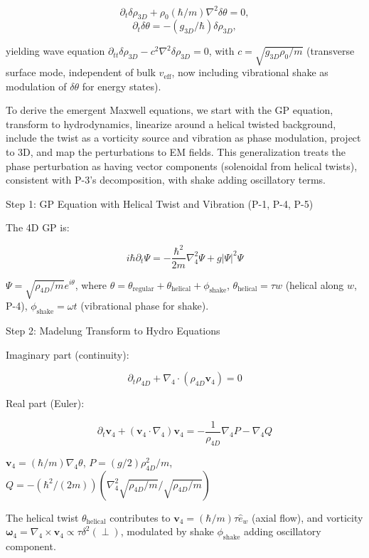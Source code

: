 \begin{equation}
\partial_t \delta \rho_{3D} + \rho_0 (\hbar / m) \nabla^2 \delta \theta = 0,
\end{equation}
\begin{equation}
\partial_t \delta \theta = - (g_{3D} / \hbar) \delta \rho_{3D},
\end{equation}

yielding wave equation $\partial_{tt} \delta \rho_{3D} - c^2 \nabla^2 \delta \rho_{3D} = 0$, with $c = \sqrt{g_{3D} \rho_0 / m}$ (transverse surface mode, independent of bulk $v_{\text{eff}}$, now including vibrational shake as modulation of $\delta \theta$ for energy states).

To derive the emergent Maxwell equations, we start with the GP equation, transform to hydrodynamics, linearize around a helical twisted background, include the twist as a vorticity source and vibration as phase modulation, project to 3D, and map the perturbations to EM fields. This generalization treats the phase perturbation as having vector components (solenoidal from helical twists), consistent with P-3's decomposition, with shake adding oscillatory terms.

Step 1: GP Equation with Helical Twist and Vibration (P-1, P-4, P-5)

The 4D GP is:

\[ i \hbar \partial_t \Psi = - \frac{\hbar^2}{2m} \nabla_4^2 \Psi + g |\Psi|^2 \Psi \]

$\Psi = \sqrt{\rho_{4D} / m} e^{i \theta}$, where $\theta = \theta_{\text{regular}} + \theta_{\text{helical}} + \phi_{\text{shake}}$, $\theta_{\text{helical}} = \tau w$ (helical along $w$, P-4), $\phi_{\text{shake}} = \omega t$ (vibrational phase for shake).

Step 2: Madelung Transform to Hydro Equations

Imaginary part (continuity):

\[ \partial_t \rho_{4D} + \nabla_4 \cdot (\rho_{4D} \mathbf{v}_4) = 0 \]

Real part (Euler):

\[ \partial_t \mathbf{v}_4 + (\mathbf{v}_4 \cdot \nabla_4) \mathbf{v}_4 = - \frac{1}{\rho_{4D}} \nabla_4 P - \nabla_4 Q \]

$\mathbf{v}_4 = (\hbar / m) \nabla_4 \theta$, $P = (g / 2) \rho_{4D}^2 / m$, $Q = - (\hbar^2 / (2m)) (\nabla_4^2 \sqrt{\rho_{4D} / m} / \sqrt{\rho_{4D} / m})$

The helical twist $\theta_{\text{helical}}$ contributes to $\mathbf{v}_4 = (\hbar / m) \tau \hat{e}_w$ (axial flow), and vorticity $\boldsymbol{\omega}_4 = \nabla_4 \times \mathbf{v}_4 \propto \tau \delta^2(\perp)$, modulated by shake $\phi_{\text{shake}}$ adding oscillatory component.

